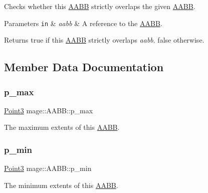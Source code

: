 Checks whether this \hyperlink{structmage_1_1_a_a_b_b}{A\+A\+BB} strictly overlaps the given \hyperlink{structmage_1_1_a_a_b_b}{A\+A\+BB}.


\begin{DoxyParams}[1]{Parameters}
\mbox{\tt in}  & {\em aabb} & A reference to the \hyperlink{structmage_1_1_a_a_b_b}{A\+A\+BB}. \\
\hline
\end{DoxyParams}
\begin{DoxyReturn}{Returns}
{\ttfamily true} if this \hyperlink{structmage_1_1_a_a_b_b}{A\+A\+BB} strictly overlaps {\itshape aabb}. {\ttfamily false} otherwise. 
\end{DoxyReturn}


\subsection{Member Data Documentation}
\hypertarget{structmage_1_1_a_a_b_b_ad0a69206176c61ce9a71f2ddb0e5deb2}{}\label{structmage_1_1_a_a_b_b_ad0a69206176c61ce9a71f2ddb0e5deb2} 
\subsubsection{\texorpdfstring{p\+\_\+max}{p\_max}}
{\footnotesize\ttfamily \hyperlink{structmage_1_1_point3}{Point3} mage\+::\+A\+A\+B\+B\+::p\+\_\+max}

The maximum extents of this \hyperlink{structmage_1_1_a_a_b_b}{A\+A\+BB}. \hypertarget{structmage_1_1_a_a_b_b_a600c62081fd3516c0be64bb81495cd1d}{}\label{structmage_1_1_a_a_b_b_a600c62081fd3516c0be64bb81495cd1d} 
\subsubsection{\texorpdfstring{p\+\_\+min}{p\_min}}
{\footnotesize\ttfamily \hyperlink{structmage_1_1_point3}{Point3} mage\+::\+A\+A\+B\+B\+::p\+\_\+min}

The minimum extents of this \hyperlink{structmage_1_1_a_a_b_b}{A\+A\+BB}. 